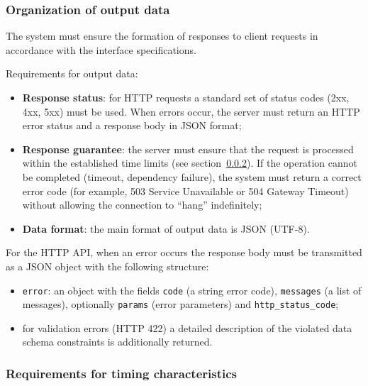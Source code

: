 \documentclass[12pt,a4paper]{extarticle}
\begin{document}
\subsubsection{Organization of output data}
\label{sec:output_data}

\begin{hseExample}
The system must ensure the formation of responses to client requests in accordance with the interface specifications.

Requirements for output data:
\begin{itemize}[nosep, leftmargin=1.25cm]
    \item \textbf{Response status}: for HTTP requests a standard set of status codes (2xx, 4xx, 5xx) must be used. When errors occur, the server must return an HTTP error status and a response body in JSON format;
    \item \textbf{Response guarantee}: the server must ensure that the request is processed within the established time limits (see section~\ref{sec:temporal_reqs}). If the operation cannot be completed (timeout, dependency failure), the system must return a correct error code (for example, 503 Service Unavailable or 504 Gateway Timeout) without allowing the connection to \enquote{hang} indefinitely;
    \item \textbf{Data format}: the main format of output data is JSON (UTF-8).
\end{itemize}

For the HTTP API, when an error occurs the response body must be transmitted as a JSON object with the following structure:
\begin{itemize}[nosep, leftmargin=1.25cm]
    \item \texttt{error}: an object with the fields \texttt{code} (a string error code), \texttt{messages} (a list of messages), optionally \texttt{params} (error parameters) and \texttt{http\_status\_code};
    \item for validation errors (HTTP 422) a detailed description of the violated data schema constraints is additionally returned.
\end{itemize}
\end{hseExample}

\subsubsection{Requirements for timing characteristics}
\label{sec:temporal_reqs}
\end{document}

